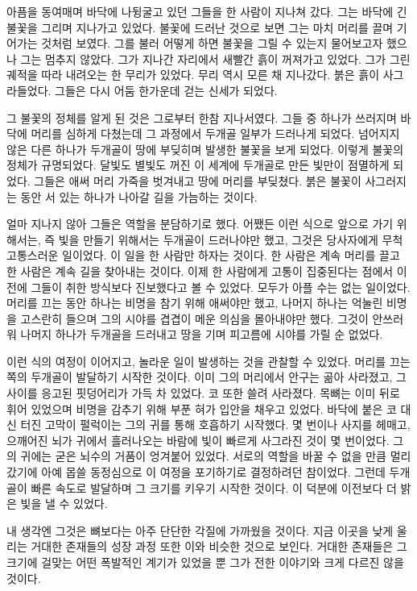 \begin{article}
아픔을 동여매며 바닥에 나뒹굴고 있던 그들을 한 사람이 지나쳐 갔다. 그는 바닥에 긴 불꽃을 그리며 지나가고 있었다. 불꽃에 드러난 것으로 보면 그는 마치 머리를 끌며 기어가는 것처럼 보였다. 그를 불러 어떻게 하면 불꽃을 그릴 수 있는지 물어보고자 했으나 그는 멈추지 않았다. 그가 지나간 자리에서 새빨간 흙이 꺼져가고 있었다. 그가 그린 궤적을 따라 내려오는 한 무리가 있었다. 무리 역시 모른 채 지나갔다. 붉은 흙이 사그라들었다. 그들은 다시 어둠 한가운데 걷는 신세가 되었다.

그 불꽃의 정체를 알게 된 것은 그로부터 한참 지나서였다. 그들 중 하나가 쓰러지며 바닥에 머리를 심하게 다쳤는데 그 과정에서 두개골 일부가 드러나게 되었다. 넘어지지 않은 다른 하나가 두개골이 땅에 부딪히며 발생한 불꽃을 보게 되었다. 이렇게 불꽃의 정체가 규명되었다. 달빛도 별빛도 꺼진 이 세계에 두개골로 만든 빛만이 점멸하게 되었다. 그들은 애써 머리 가죽을 벗겨내고 땅에 머리를 부딪쳤다. 붉은 불꽃이 사그러지는 동안 서 있는 하나가 나아갈 길을 가늠하는 것이다.

얼마 지나지 않아 그들은 역할을 분담하기로 했다. 어쨌든 이런 식으로 앞으로 가기 위해서는, 즉 빛을 만들기 위해서는 두개골이 드러나야만 했고, 그것은 당사자에게 무척 고통스러운 일이었다. 이 일을 한 사람만 하자는 것이다. 한 사람은 계속 머리를 끌고 한 사람은 계속 길을 찾아내는 것이다. 이제 한 사람에게 고통이 집중된다는 점에서 이전에 그들이 취한 방식보다 진보했다고 볼 수 있었다. 모두가 아플 수는 없는 일이었다. 머리를 끄는 동안 하나는 비명을 참기 위해 애써야만 했고, 나머지 하나는 억눌린 비명을 고스란히 들으며 그의 시야를 겹겹이 메운 의심을 몰아내야만 했다. 그것이 안쓰러워 나머지 하나가 두개골을 드러내고 땅을 기며 피고름에 시야를 가릴 순 없었다.

이런 식의 여정이 이어지고, 놀라운 일이 발생하는 것을 관찰할 수 있었다. 머리를 끄는 쪽의 두개골이 발달하기 시작한 것이다. 이미 그의 머리에서 안구는 곪아 사라졌고, 그 사이를 응고된 핏덩어리가 가득 차 있었다. 코 또한 쓸려 사라졌다. 목뼈는 이미 뒤로 휘어 있었으며 비명을 감추기 위해 부푼 혀가 입안을 채우고 있었다. 바닥에 붙은 코 대신 터진 고막이 펄럭이는 그의 귀를 통해 호흡하기 시작했다. 몇 번이나 사지를 헤매고, 으깨어진 뇌가 귀에서 흘러나오는 바람에 빛이 빠르게 사그라진 것이 몇 번이었다. 그의 귀에는 굳은 뇌수의 거품이 엉겨붙어 있었다. 서로의 역할을 바꿀 수 없을 만큼 멀리 갔기에 아예 몹쓸 동정심으로 이 여정을 포기하기로 결정하려던 참이었다. 그런데 두개골이 빠른 속도로 발달하며 그 크기를 키우기 시작한 것이다. 이 덕분에 이전보다 더 밝은 빛을 낼 수 있었다.

내 생각엔 그것은 뼈보다는 아주 단단한 각질에 가까웠을 것이다. 지금 이곳을 낮게 울리는 거대한 존재들의 성장 과정 또한 이와 비슷한 것으로 보인다. 거대한 존재들은 그 크기에 걸맞는 어떤 폭발적인 계기가 있었을 뿐 그가 전한 이야기와 크게 다르진 않을 것이다.


\end{article}
